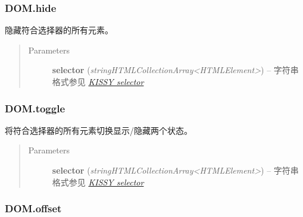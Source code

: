 \documentclass[letterpaper,10pt,english]{sphinxmanual}
\begin{document}
\subsubsection{DOM.hide}
\label{api/core/dom/hide:dom-hide}\label{api/core/dom/hide::doc}

\begin{fulllineitems}
\label{api/core/dom/hide:DOM.hide}
隐藏符合选择器的所有元素。
\begin{quote}\begin{description}
\item[{Parameters}] \leavevmode
\textbf{selector} (\emph{string\textbar{}HTMLCollection\textbar{}Array\textless{}HTMLElement\textgreater{}}) -- 字符串格式参见 {\hyperref[api/core/dom/selector:dom-selector]{\emph{KISSY selector}}}

\end{description}\end{quote}

\end{fulllineitems}



\subsubsection{DOM.toggle}
\label{api/core/dom/toggle::doc}\label{api/core/dom/toggle:dom-toggle}

\begin{fulllineitems}
\label{api/core/dom/toggle:DOM.toggle}
将符合选择器的所有元素切换显示/隐藏两个状态。
\begin{quote}\begin{description}
\item[{Parameters}] \leavevmode
\textbf{selector} (\emph{string\textbar{}HTMLCollection\textbar{}Array\textless{}HTMLElement\textgreater{}}) -- 字符串格式参见 {\hyperref[api/core/dom/selector:dom-selector]{\emph{KISSY selector}}}

\end{description}\end{quote}

\end{fulllineitems}



\subsubsection{DOM.offset}
\label{api/core/dom/offset:dom-offset}\label{api/core/dom/offset::doc}
\end{document}
